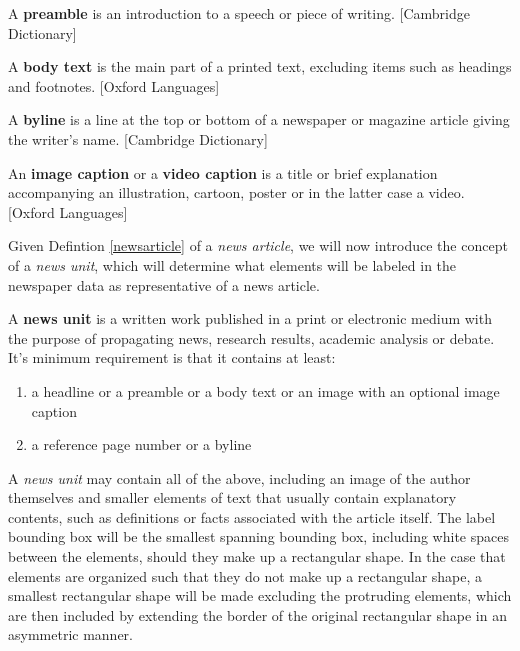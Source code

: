 \documentclass[english, bibtex]{kththesis}
\begin{document}
\begin{defn}
\label{preamble}
A \textbf{preamble} is an introduction to a speech or piece of writing. [Cambridge Dictionary]
\end{defn}

\begin{defn}
\label{body text}
A \textbf{body text} is the main part of a printed text, excluding items such as headings and footnotes. [Oxford Languages]
\end{defn}

\begin{defn}
\label{byline}
A \textbf{byline} is a line at the top or bottom of a newspaper or magazine article giving the writer's name. [Cambridge Dictionary]
\end{defn}

\begin{defn}
\label{img}
An \textbf{image caption} or a \textbf{video caption} is a title or brief explanation accompanying an illustration, cartoon, poster or in the latter case a video. [Oxford Languages]
\end{defn}

Given Defintion \ref{newsarticle} of a \textit{news article}, we will now introduce the concept of a \textit{news unit}, which will determine what elements will be labeled in the newspaper data as representative of a news article.

\begin{defn}
\label{newsunit}
A \textbf{news unit} is a written work published in a print or electronic medium with the purpose of propagating news, research results, academic analysis or debate. It’s minimum requirement is that it contains at least:

\begin{enumerate}
\item a headline or a preamble or a body text or an image with an optional image caption
\item a reference page number or a byline
\end{enumerate}
\end{defn}

A \textit{news unit} may contain all of the above, including an image of the author themselves and smaller elements of text that usually contain explanatory contents, such as definitions or facts associated with the article itself. The label bounding box will be the smallest spanning bounding box, including white spaces between the elements, should they make up a rectangular shape. In the case that elements are organized such that they do not make up a rectangular shape, a smallest rectangular shape will be made excluding the protruding elements, which are then included by extending the border of the original rectangular shape in an asymmetric manner.
\end{document}
